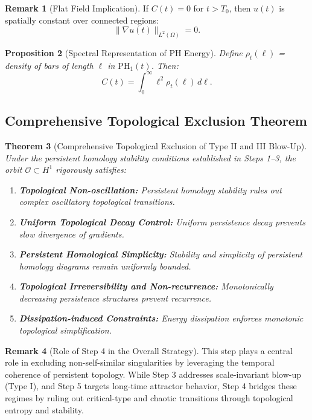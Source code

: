 \documentclass[11pt]{article}
\newtheorem{theorem}{Theorem}[section]
\newtheorem{proposition}[theorem]{Proposition}
\theoremstyle{definition}
\newtheorem{remark}[theorem]{Remark}
\begin{document}
\begin{remark}[Flat Field Implication]
If $C(t) = 0$ for $t > T_0$, then $u(t)$ is spatially constant over connected regions:
\[
\|\nabla u(t)\|_{L^2(\Omega)} = 0.
\]
\end{remark}

\begin{proposition}[Spectral Representation of PH Energy]
Define $\rho_t(\ell)$ = density of bars of length $\ell$ in $\mathrm{PH}_1(t)$. Then:
\[
C(t) = \int_0^\infty \ell^2 \rho_t(\ell) \, d\ell.
\]
\end{proposition}

\subsection*{Comprehensive Topological Exclusion Theorem}

\begin{theorem}[Comprehensive Topological Exclusion of Type II and III Blow-Up]
\label{thm:comprehensive_exclusion}
Under the persistent homology stability conditions established in Steps 1--3, the orbit $\mathcal{O} \subset H^1$ rigorously satisfies:
\begin{enumerate}
  \item \textbf{Topological Non-oscillation:} Persistent homology stability rules out complex oscillatory topological transitions.
  \item \textbf{Uniform Topological Decay Control:} Uniform persistence decay prevents slow divergence of gradients.
  \item \textbf{Persistent Homological Simplicity:} Stability and simplicity of persistent homology diagrams remain uniformly bounded.
  \item \textbf{Topological Irreversibility and Non-recurrence:} Monotonically decreasing persistence structures prevent recurrence.
  \item \textbf{Dissipation-induced Constraints:} Energy dissipation enforces monotonic topological simplification.
\end{enumerate}
\end{theorem}

\begin{remark}[Role of Step 4 in the Overall Strategy]
This step plays a central role in excluding non-self-similar singularities by leveraging the temporal coherence of persistent topology. While Step 3 addresses scale-invariant blow-up (Type I), and Step 5 targets long-time attractor behavior, Step 4 bridges these regimes by ruling out critical-type and chaotic transitions through topological entropy and stability.
\end{remark}
\end{document}
